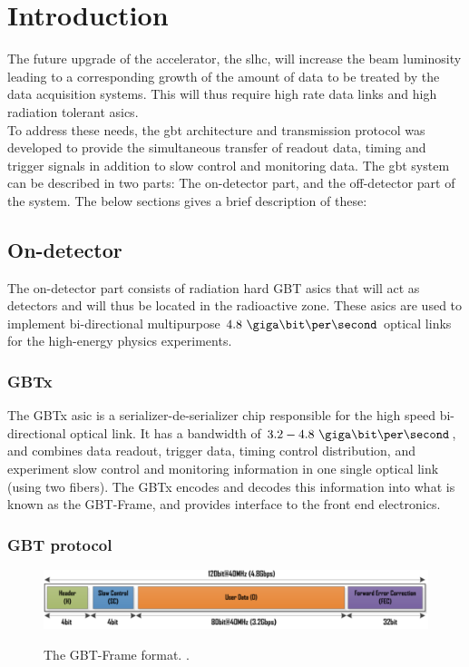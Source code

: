 \documentclass[main.tex]{subfiles}
\begin{document}
\chapter{Introduction}
The future upgrade of the  accelerator, the \gls{slhc}, will increase the beam luminosity leading to a corresponding growth of the amount of data to be treated by the data acquisition systems. This will thus require high rate data links and high radiation tolerant \glspl{asic}.\\

To address these needs, the \gls{gbt} architecture and transmission protocol was developed to provide the simultaneous transfer of readout data, timing and trigger signals in addition to slow control and monitoring data. The \gls{gbt} system can be described in two parts: The on-detector part, and the off-detector part of the system. The below sections gives a brief description of these:

\section{On-detector}
The on-detector part consists of radiation hard GBT \acrshort{asic}s that will act as detectors and will thus be located in the radioactive zone. These \glspl{asic} are used to implement bi-directional multipurpose $4.8~\giga\bit\per\second$ optical links for the high-energy physics experiments.

\subsection{GBTx}
The GBTx \gls{asic} is a serializer-de-serializer chip responsible for the high speed bi-directional optical link. It has a bandwidth of $3.2 - 4.8~\giga\bit\per\second$, and combines data readout, trigger data, timing control distribution, and experiment slow control and monitoring information in one single optical link (using two fibers). The GBTx encodes and decodes this information into what is known as the GBT-Frame, and provides interface to the front end electronics. \cite{gbtxman}

\subsection{GBT protocol}



\begin{figure} %
\includegraphics[width=\linewidth]{../img/gbtframe}  \\[0.1 cm]
\caption{The GBT-Frame format. \cite[Figure 4]{gbt_fpga}.}
\label{fig:hsmc}
\end{figure}
\end{document}

